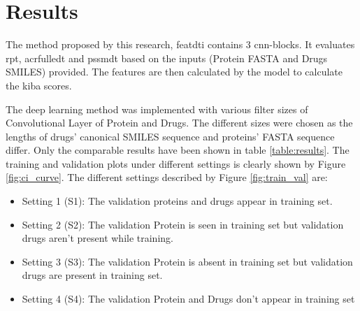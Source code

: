 \section{Results}

The method proposed by this research, \acrfull{featdti} contains 3 \acrfull{cnn}-blocks. It evaluates \acrfull{rpt}, acrfull{edt} and \acrfull{pssmdt} based on the inputs (Protein FASTA and Drugs SMILES) provided. The features are then calculated by the model to calculate the \acrfull{kiba} scores.

The deep learning method was implemented with various filter sizes of Convolutional Layer of Protein and Drugs. The different sizes were chosen as the lengths of drugs' canonical SMILES sequence and proteins' FASTA sequence differ. Only the comparable results have been shown in table \ref{table:results}. The training and validation plots under different settings is clearly shown by Figure \ref{fig:ci_curve}. The different settings described by Figure \ref{fig:train_val} are:
\begin{itemize}
    \item Setting 1 (S1): The validation proteins and drugs appear in training set.
    \item Setting 2 (S2): The validation Protein is seen in training set but validation drugs aren't present while training.
    \item Setting 3 (S3): The validation Protein is absent in training set but validation drugs are present in training set.
    \item Setting 4 (S4): The validation Protein and Drugs don't appear in training set
\end{itemize}

